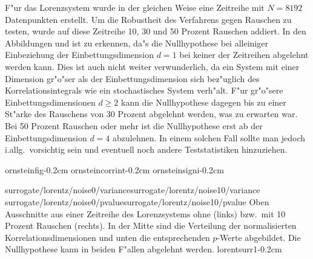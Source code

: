 F"ur das Lorenzsystem wurde in der gleichen Weise eine Zeitreihe mit $N=8192$
Datenpunkten erstellt. Um die Robustheit des Verfahrens gegen Rauschen zu testen, wurde
auf diese Zeitreihe 10, 30 und 50 Prozent Rauschen addiert. In den Abbildungen
 und  ist zu erkennen, da"s die Nullhypothese bei
alleiniger Einbeziehung  der Einbettungsdimension $d=1$ bei keiner der Zeitreihen abgelehnt werden
kann. Dies ist auch nicht weiter verwunderlich, da ein System mit einer Dimension gr"o"ser 
als der Einbettungsdimension sich bez"uglich des Korrelationsintegrals wie ein
stochastisches System verh"alt. F"ur gr"o"sere Einbettungsdimensionen $d\geq2$ kann die
Nullhypothese dagegen bis zu einer St"arke des Rauschens von 30 Prozent abgelehnt werden,
was zu erwarten war. Bei 50 Prozent Rauschen oder mehr ist die Nullhypothese erst ab der
Einbettungsdimension $d=4$ abzulehnen. In einem solchen Fall sollte man jedoch i.allg.\   vorsichtig sein und
eventuell noch andere Teststatistiken hinzuziehen.

\clearpage
{
\def\psposmode{\psseparate}
{ornsteinfig}{-0.2cm}
{ornsteincorrint}{-0.2cm}
{ornsteinsigni}{-0.2cm}
}


{surrogate/lorentz/noise0/variance}{surrogate/lorentz/noise10/variance}
{surrogate/lorentz/noise0/pvalue}{surrogate/lorentz/noise10/pvalue}
{Oben Ausschnitte aus einer Zeitreihe des Lorenzsystems ohne (links) bzw.\  mit 10 Prozent
  Rauschen (rechts). In der Mitte sind die Verteilung der normalisierten
  Korrelationsdimensionen und unten die entsprechenden $p$-Werte abgebildet. Die
  Nullhypothese kann in beiden F"allen abgelehnt werden.
}{lorentsurr1}{-0.2cm}

